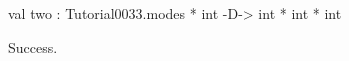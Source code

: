 \chklistingtrue
{}
\begin{ChkListingMsg}
val two : Tutorial0033.modes * int -D-> int * int * int
\end{ChkListingMsg}
\begin{ChkListingErr}
Success.
\end{ChkListingErr}
